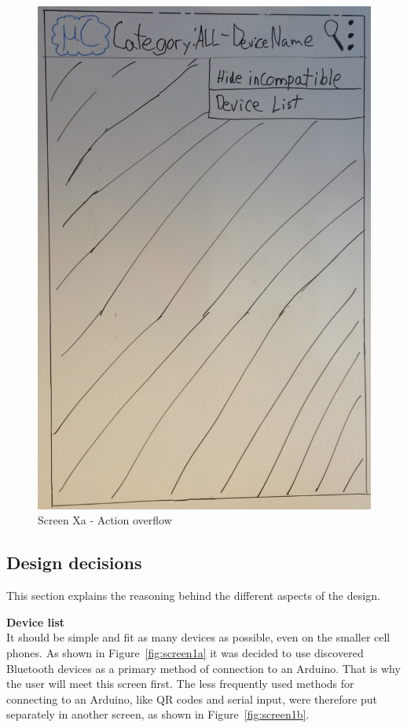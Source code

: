\begin{figure}[H]
\centering
\includegraphics[scale=0.2]{images/Design_guide/ScreenXa.png}
\caption{Screen Xa - Action overflow}
\label{fig:screenXa}
\end{figure}

	\subsection{Design decisions}
	This section explains the reasoning behind the different aspects of the design. 

	\textbf{Device list}\\
	It should be simple and fit as many devices as possible, even on the smaller cell phones. As shown in Figure~\ref{fig:screen1a} it was decided to use discovered Bluetooth devices as a primary method of connection to an Arduino. That is why the user will meet this screen first. The less frequently used methods for connecting to an Arduino, like QR codes and serial input, were therefore put separately in another screen, as shown in Figure~\ref{fig:screen1b}. \\

